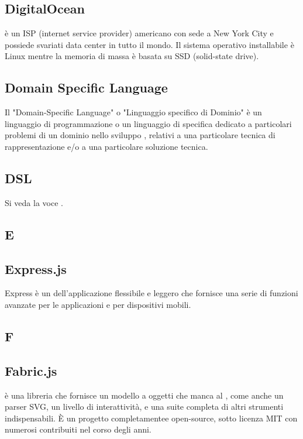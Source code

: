 \subsection{DigitalOcean}
 è un ISP (internet service provider) americano con sede a New York City e possiede svariati data center in tutto il mondo. Il sistema operativo installabile è Linux mentre la memoria di massa è basata su SSD (solid-state drive).

\subsection{Domain Specific Language}
Il "Domain-Specific Language" o "Linguaggio specifico di Dominio" è un linguaggio
di programmazione o un linguaggio di specifica dedicato a particolari
problemi di un dominio nello sviluppo , relativi a una particolare tecnica
di rappresentazione e/o a una particolare soluzione tecnica.

\subsection{DSL}
Si veda la voce .

\newpage

\begin{center}
\Huge\section{\uppercase{E}}
\end{center}

\subsection{Express.js}
Express è un  dell'applicazione   flessibile e leggero che fornisce una serie di funzioni avanzate per le applicazioni  e per dispositivi mobili.

\newpage

\begin{center}
\Huge\section{\uppercase{F}}
\end{center}

\subsection{Fabric.js}
 è una libreria che fornisce un modello a oggetti che manca al , come anche un parser SVG, un livello di interattività, e una suite completa di altri strumenti indispensabili. È un progetto completamentee open-source, sotto licenza MIT con numerosi contribuiti nel corso degli anni.

